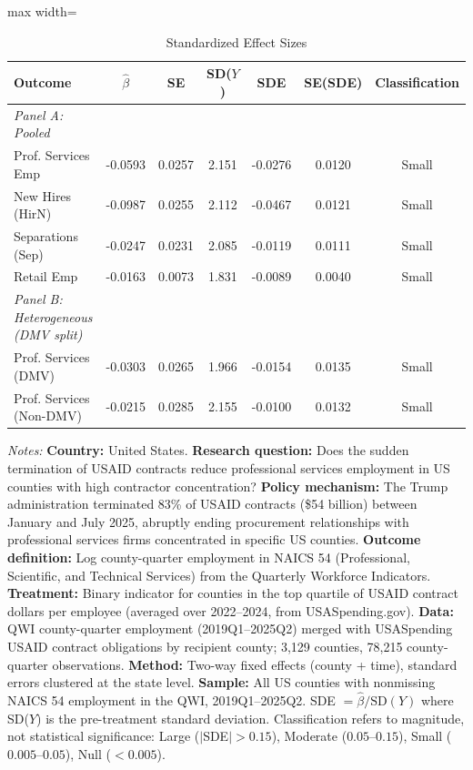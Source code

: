 
\begin{table}[t]
\centering
\caption{Standardized Effect Sizes}
\label{tab:sde}
\begin{adjustbox}{max width=\textwidth}
\begin{tabular}{lcccccc}
\hline\hline
Outcome & $\hat{\beta}$ & SE & SD($Y$) & SDE & SE(SDE) & Classification \\
\hline
\textit{Panel A: Pooled} & & & & & & \\
\quad Prof. Services Emp & -0.0593 & 0.0257 & 2.151 & -0.0276 & 0.0120 & Small \\
\quad New Hires (HirN) & -0.0987 & 0.0255 & 2.112 & -0.0467 & 0.0121 & Small \\
\quad Separations (Sep) & -0.0247 & 0.0231 & 2.085 & -0.0119 & 0.0111 & Small \\
\quad Retail Emp & -0.0163 & 0.0073 & 1.831 & -0.0089 & 0.0040 & Small \\
\hline
\textit{Panel B: Heterogeneous (DMV split)} & & & & & & \\
\quad Prof. Services (DMV) & -0.0303 & 0.0265 & 1.966 & -0.0154 & 0.0135 & Small \\
\quad Prof. Services (Non-DMV) & -0.0215 & 0.0285 & 2.155 & -0.0100 & 0.0132 & Small \\

\hline\hline
\end{tabular}
\end{adjustbox}
\begin{tablenotes}
\item \textit{Notes:} \textbf{Country:} United States. \textbf{Research question:} Does the sudden termination of USAID contracts reduce professional services employment in US counties with high contractor concentration? \textbf{Policy mechanism:} The Trump administration terminated 83\% of USAID contracts (\$54 billion) between January and July 2025, abruptly ending procurement relationships with professional services firms concentrated in specific US counties. \textbf{Outcome definition:} Log county-quarter employment in NAICS 54 (Professional, Scientific, and Technical Services) from the Quarterly Workforce Indicators. \textbf{Treatment:} Binary indicator for counties in the top quartile of USAID contract dollars per employee (averaged over 2022--2024, from USASpending.gov). \textbf{Data:} QWI county-quarter employment (2019Q1--2025Q2) merged with USASpending USAID contract obligations by recipient county; 3,129 counties, 78,215 county-quarter observations. \textbf{Method:} Two-way fixed effects (county + time), standard errors clustered at the state level. \textbf{Sample:} All US counties with nonmissing NAICS 54 employment in the QWI, 2019Q1--2025Q2. SDE $= \hat{\beta} / \text{SD}(Y)$ where SD($Y$) is the pre-treatment standard deviation. Classification refers to magnitude, not statistical significance: Large ($|$SDE$| > 0.15$), Moderate ($0.05$--$0.15$), Small ($0.005$--$0.05$), Null ($< 0.005$).
\end{tablenotes}
\end{table}

